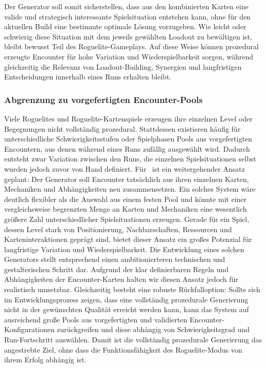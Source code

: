 Der Generator soll somit sicherstellen, dass aus den kombinierten Karten eine valide und strategisch interessante Spielsituation entstehen kann, ohne für den aktuellen Build eine bestimmte optimale Lösung vorzugeben. Wie leicht oder schwierig diese Situation mit dem jeweils gewählten Loadout zu bewältigen ist, bleibt bewusst Teil des Roguelite-Gameplays. Auf diese Weise können prozedural erzeugte Encounter für hohe Variation und Wiederspielbarkeit sorgen, während gleichzeitig die Relevanz von Loadout-Building, Synergien und langfristigen Entscheidungen innerhalb eines Runs erhalten bleibt.

\subsubsection{Abgrenzung zu vorgefertigten Encounter-Pools}
Viele Roguelites und Roguelite-Kartenspiele erzeugen ihre einzelnen Level oder Begegnungen nicht vollständig prozedural. Stattdessen existieren häufig für unterschiedliche Schwierigkeitsstufen oder Spielphasen Pools aus vorgefertigten Encountern, aus denen während eines Runs zufällig ausgewählt wird. Dadurch entsteht zwar Variation zwischen den Runs, die einzelnen Spielsituationen selbst wurden jedoch zuvor von Hand definiert.
Für \coc\ ist ein weitergehender Ansatz geplant: Der Generator soll Encounter tatsächlich aus ihren einzelnen Karten, Mechaniken und Abhängigkeiten neu zusammensetzen. Ein solches System wäre deutlich flexibler als die Auswahl aus einem festen Pool und könnte mit einer vergleichsweise begrenzten Menge an Karten und Mechaniken eine wesentlich größere Zahl unterschiedlicher Spielsituationen erzeugen. Gerade für ein Spiel, dessen Level stark von Positionierung, Nachbarschaften, Ressourcen und Karteninteraktionen geprägt sind, bietet dieser Ansatz ein großes Potenzial für langfristige Variation und Wiederspielbarkeit.
Die Entwicklung eines solchen Generators stellt entsprechend einen ambitionierteren technischen und gestalterischen Schritt dar. Aufgrund der klar definierbaren Regeln und Abhängigkeiten der Encounter-Karten halten wir diesen Ansatz jedoch für realistisch umsetzbar. Gleichzeitig besteht eine robuste Rückfalloption: Sollte sich im Entwicklungsprozess zeigen, dass eine vollständig prozedurale Generierung nicht in der gewünschten Qualität erreicht werden kann, kann das System auf ausreichend große Pools aus vorgefertigten und validierten Encounter-Konfigurationen zurückgreifen und diese abhängig von Schwierigkeitsgrad und Run-Fortschritt auswählen.
Damit ist die vollständig prozedurale Generierung das angestrebte Ziel, ohne dass die Funktionsfähigkeit des Roguelite-Modus von ihrem Erfolg abhängig ist.

